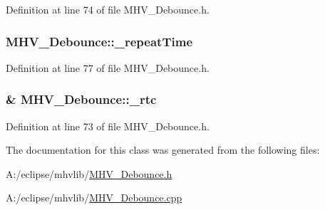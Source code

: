 Definition at line 74 of file M\-H\-V\-\_\-\-Debounce.\-h.

\hypertarget{class_m_h_v___debounce_a422167777e3bfcf6b7b46b992058950f}{
\subsubsection[{\-\_\-repeat\-Time}]{ M\-H\-V\-\_\-\-Debounce\-::\-\_\-repeat\-Time\hspace{0.3cm}{\ttfamily [protected]}}}\label{class_m_h_v___debounce_a422167777e3bfcf6b7b46b992058950f}


Definition at line 77 of file M\-H\-V\-\_\-\-Debounce.\-h.

\hypertarget{class_m_h_v___debounce_a5594f588099ccfcff2b3b23b503e8f6d}{
\subsubsection[{\-\_\-rtc}]{\& M\-H\-V\-\_\-\-Debounce\-::\-\_\-rtc\hspace{0.3cm}{\ttfamily [protected]}}}\label{class_m_h_v___debounce_a5594f588099ccfcff2b3b23b503e8f6d}


Definition at line 73 of file M\-H\-V\-\_\-\-Debounce.\-h.



The documentation for this class was generated from the following files\-:\begin{DoxyCompactItemize}
\item 
A\-:/eclipse/mhvlib/\hyperlink{_m_h_v___debounce_8h}{M\-H\-V\-\_\-\-Debounce.\-h}\item 
A\-:/eclipse/mhvlib/\hyperlink{_m_h_v___debounce_8cpp}{M\-H\-V\-\_\-\-Debounce.\-cpp}\end{DoxyCompactItemize}
